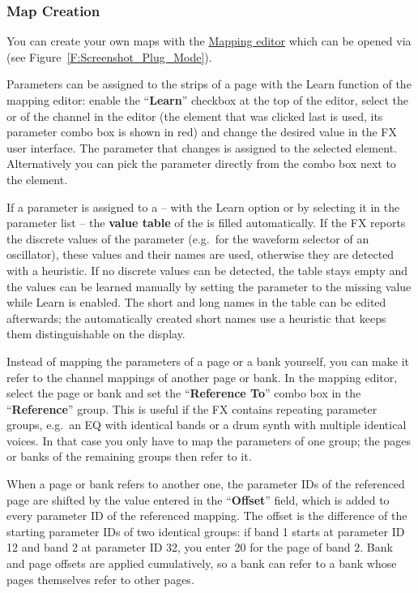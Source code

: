 \subsubsection{Map Creation}\label{createmaps}

You can create your own maps with the
\hyperref[F:Screenshot_Plug_Mode]{Mapping editor} which can be opened
via \alt \plug (see Figure~\ref{F:Screenshot_Plug_Mode}). 


Parameters can be assigned to the strips of a page with the Learn
function of the mapping editor: enable the ``\textbf{Learn}'' checkbox at the
top of the editor, select the \fader or \vpot of the channel in the
editor (the element that was clicked last is used, its parameter
combo box is shown in red) and change the desired value in the FX
user interface. The parameter that changes is assigned to the
selected element. Alternatively you can pick the parameter directly
from the combo box next to the element.

If a parameter is assigned to a \vpot -- with the Learn option or by
selecting it in the parameter list -- the \textbf{value table} of the \vpot
is filled automatically. If the FX reports the discrete values of
the parameter (e.g.\ for the waveform selector of an oscillator),
these values and their names are used, otherwise they are detected
with a heuristic. If no discrete values can be detected, the table
stays empty and the values can be learned manually by setting the
parameter to the missing value while Learn is enabled. The short and
long names in the table can be edited afterwards; the automatically
created short names use a heuristic that keeps them distinguishable
on the display.

Instead of mapping the parameters of a page or a bank yourself, you
can make it refer to the channel mappings of another page or bank.
In the mapping editor, select the page or bank and set the
``\textbf{Reference To}'' combo box in the ``\textbf{Reference}'' group. This is useful
if the FX contains repeating parameter groups, e.g.\ an EQ with
identical bands or a drum synth with multiple identical voices. In
that case you only have to map the parameters of one group; the
pages or banks of the remaining groups then refer to it.

When a page or bank refers to another one, the parameter IDs of the
referenced page are shifted by the value entered in the ``\textbf{Offset}''
field, which is added to every parameter ID of the referenced
mapping. The offset is the difference of the starting parameter IDs
of two identical groups: if band 1 starts at parameter ID 12 and
band 2 at parameter ID 32, you enter 20 for the page of band 2. Bank
and page offsets are applied cumulatively, so a bank can refer to a
bank whose pages themselves refer to other pages.


